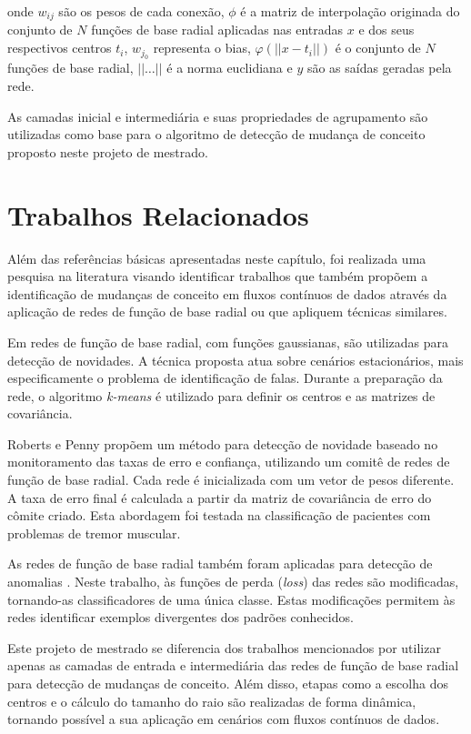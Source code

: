 \documentclass[qual, classic, a4paper]{ufbathesis}
\begin{document}
onde $w_{ij}$ são os pesos de cada conexão, $\phi$ é a matriz de interpolação originada do conjunto de $N$ funções
de base radial aplicadas nas entradas $x$ e dos seus respectivos centros $t_i$,
$w_{j_0}$ representa o bias, $\varphi (||{{x}}-{{t}}_{i}||)$ é o conjunto de $N$ funções de base radial,
$||\ldots||$ é a norma euclidiana e $y$ são as saídas geradas pela rede.

As camadas inicial e intermediária e suas propriedades de agrupamento são utilizadas como base para o algoritmo de detecção de mudança de conceito 
proposto neste projeto de mestrado. 

\section{Trabalhos Relacionados}

Além das referências básicas apresentadas neste capítulo, foi realizada uma pesquisa na literatura visando identificar trabalhos 
que também propõem a identificação de mudanças de conceito em fluxos contínuos de dados através da aplicação de redes de função de base radial
ou que apliquem técnicas similares.

Em \cite{Jianping:Venkateswarlu:RBF:SpeakerIdentification} redes de função de base radial, com funções gaussianas, são utilizadas para detecção de novidades.
A técnica proposta atua sobre cenários estacionários, mais especificamente o problema de identificação de falas.
Durante a preparação da rede, o algoritmo \textit{k-means} é utilizado para definir os centros e as matrizes de covariância.

Roberts e Penny \cite{Roberts:Penny:Novelty:Confidence} propõem  um método para detecção de novidade baseado no monitoramento das taxas de erro e confiança, 
utilizando um comitê de redes de função de base radial. 
Cada rede é inicializada com um vetor de pesos diferente.
A taxa de erro final é calculada a partir da matriz de covariância de erro do cômite criado.
Esta abordagem foi testada na classificação de pacientes com problemas de tremor muscular.

As redes de função de base radial também foram aplicadas para detecção de anomalias \cite{Bazargani2018RadialBF}.
Neste trabalho, às funções de perda (\textit{loss}) das redes são modificadas, 
tornando-as classificadores de uma única classe. 
Estas modificações permitem às redes identificar exemplos divergentes dos padrões conhecidos.

Este projeto de mestrado se diferencia dos trabalhos mencionados por utilizar apenas as camadas de entrada e intermediária das redes de função de base radial para detecção de mudanças de conceito.
Além disso, etapas como a escolha dos centros e o cálculo do tamanho do raio são realizadas de forma dinâmica, tornando possível a sua aplicação em cenários com fluxos contínuos de dados.
\end{document}
